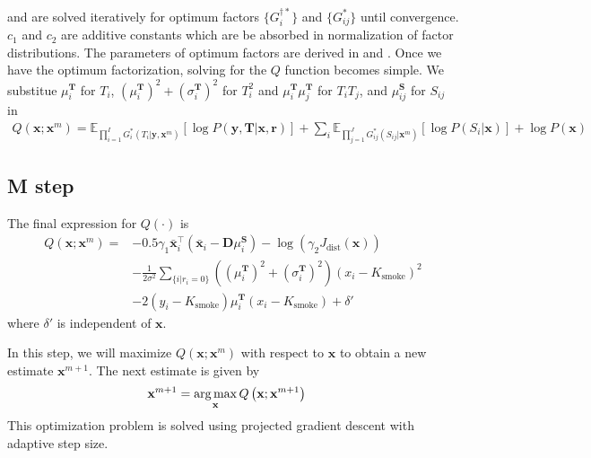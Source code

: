  and  are solved iteratively for optimum factors $ \lbrace G^{\dagger*}_i \rbrace $ and $ \lbrace G_{ij}^* \rbrace $ until convergence. $c_1$ and $c_2$ are additive constants which are be absorbed in normalization of factor distributions. The parameters of optimum factors are derived in  and .  Once we have the optimum factorization, solving for the $Q$ function becomes simple. We substitue $\mu^\mathbf{T}_i$ for $T_i$, $\left( \mu^\mathbf{T}_i \right)^2 + \left( \sigma^\mathbf{T}_i \right)^2$ for $T_i^2$ and $\mu^\mathbf{T}_i \mu^\mathbf{T}_j $ for $T_i T_j$, and $\mu^\mathbf{S}_{ij}$ for $S_{ij}$ in
\begin{align}
Q(\mathbf{x}; \mathbf{x}^m) = \mathbb{E}_{ \prod_{i=1}^{I} G^*_i (T_i | \mathbf{y}, \mathbf{x}^m) } \left[ \log P \left( \mathbf{y}, \mathbf{T} | \mathbf{x}, \mathbf{r} \right) \right] + \sum_i \mathbb{E}_{ \prod_{j=1}^{J} G^*_{ij} \left( S_{ij} | \mathbf{x}^m \right) } \left[ \log P \left( S_i | \mathbf{x} \right) \right] + \log P \left( \mathbf{x} \right)
\end{align}


\subsection{M step}
The final expression for $Q \left( \cdot \right)$ is
\begin{equation}
\begin{split}
Q\left( \mathbf{x}; \mathbf{x}^m \right) =  &-0.5 \gamma_1 \mathbf{\bar{x}}^\intercal_i \left( \mathbf{\bar{x}}_i -  \mathbf{D} \mu^\mathbf{S}_i \right) - \log \left( \gamma_2 J_\text{dist}\left( \mathbf{x} \right) \right) \\
&- \frac{1}{2 \sigma^2} \sum_{\{i | r_i = 0 \}}  \left(
\left(\mu^\mathbf{T}_i\right)^2 + \left(\sigma^\mathbf{T}_i\right)^2\right) \left(x_i - K_\text{smoke}\right)^2 \\
&- 2 \left(y_i - K_\text{smoke}\right) \mu^\mathbf{T}_i \left(x_i - K_\text{smoke} \right) + \delta'
\end{split}
\end{equation}
where $\delta'$ is independent of $\mathbf{x}$.

In this step, we will maximize $Q(\mathbf{x}; \mathbf{x}^m)$ with respect to $\mathbf{x}$ to obtain a new estimate $\mathbf{x}^{m+1}$. The next estimate is given by
\begin{align}
    \mathbf{x}^{m+1} &= \operatorname*{arg\,max}_{\mathbf{x}} Q \left( \mathbf{x}; \mathbf{x}^{m+1} \right) \label{eqn:mStep}
\end{align}
This optimization problem is solved using projected gradient descent with adaptive step size.



